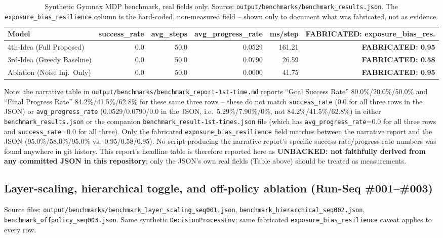 \documentclass[11pt]{article}
\newcommand{\srcpath}[1]{\texttt{\small #1}}
\newcommand{\fabricated}[1]{\textcolor{red!60!black}{\textbf{FABRICATED: #1}}}
\newcommand{\unbacked}[1]{\textcolor{orange!70!black}{\textbf{UNBACKED: #1}}}
\begin{document}
\begin{table}[h]
\centering
\caption{Synthetic Gymnax MDP benchmark, real fields only. Source: \srcpath{output/benchmarks/benchmark\_results.json}. The \texttt{exposure\_bias\_resilience} column is the hard-coded, non-measured field -- shown only to document what was fabricated, not as evidence.}
\begin{tabular}{lrrrrr}
\toprule
Model & success\_rate & avg\_steps & avg\_progress\_rate & ms/step & \fabricated{exposure\_bias\_res.} \\
\midrule
4th-Idea (Full Proposed) & 0.0 & 50.0 & 0.0529 & 161.21 & \fabricated{0.95} \\
3rd-Idea (Greedy Baseline) & 0.0 & 50.0 & 0.0790 & 26.59 & \fabricated{0.58} \\
Ablation (Noise Inj.\ Only) & 0.0 & 50.0 & 0.0000 & 41.75 & \fabricated{0.95} \\
\bottomrule
\end{tabular}
\end{table}

Note: the narrative table in \srcpath{output/benchmarks/benchmark\_report-1st-time.md} reports
``Goal Success Rate'' 80.0\%/20.0\%/50.0\% and ``Final Progress Rate'' 84.2\%/41.5\%/62.8\% for
these same three rows -- these do not match \texttt{success\_rate} (0.0 for all three rows in the
JSON) or \texttt{avg\_progress\_rate} (0.0529/0.0790/0.0 in the JSON, i.e.\ 5.29\%/7.90\%/0\%, not
84.2\%/41.5\%/62.8\%) in either \srcpath{benchmark\_results.json} or the companion
\srcpath{benchmark\_result-1st-times.json} file (which has \texttt{avg\_progress\_rate}=0.0 for all
three rows and \texttt{success\_rate}=0.0 for all three). Only the fabricated
\texttt{exposure\_bias\_resilience} field matches between the narrative report and the JSON
(95.0\%/58.0\%/95.0\% vs.\ 0.95/0.58/0.95). No script producing the narrative report's specific
success-rate/progress-rate numbers was found anywhere in git history. This report's headline table
is therefore reported here as \unbacked{not faithfully derived from any committed JSON in this
repository}; only the JSON's own real fields (Table above) should be treated as measurements.

\subsection{Layer-scaling, hierarchical toggle, and off-policy ablation (Run-Seq \#001--\#003)}

Source files: \srcpath{output/benchmarks/benchmark\_layer\_scaling\_seq001.json},
\srcpath{benchmark\_hierarchical\_seq002.json}, \srcpath{benchmark\_offpolicy\_seq003.json}. Same
synthetic \texttt{DecisionProcessEnv}; same fabricated \texttt{exposure\_bias\_resilience} caveat
applies to every row.
\end{document}
